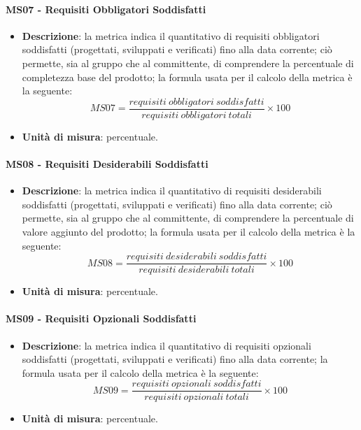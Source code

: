 		\paragraph{MS07 - Requisiti Obbligatori Soddisfatti}
		\begin{itemize}
			\item \textbf{Descrizione}: la metrica indica il quantitativo di requisiti obbligatori soddisfatti (progettati, sviluppati e verificati) fino alla data corrente; ciò permette, sia al gruppo che al committente, di comprendere la percentuale di completezza base del prodotto; la formula usata per il calcolo della metrica è la seguente:
            \[
            MS07 = \frac{requisiti\ obbligatori\ soddisfatti}{requisiti\ obbligatori\ totali} \times 100
            \]
			\item \textbf{Unità di misura}: percentuale.
		\end{itemize}

		\paragraph{MS08 - Requisiti Desiderabili Soddisfatti}
		\begin{itemize}
			\item \textbf{Descrizione}: la metrica indica il quantitativo di requisiti desiderabili soddisfatti (progettati, sviluppati e verificati) fino alla data corrente; ciò permette, sia al gruppo che al committente, di comprendere la percentuale di valore aggiunto del prodotto; la formula usata per il calcolo della metrica è la seguente:
            \[
            MS08 = \frac{requisiti\ desiderabili\ soddisfatti}{requisiti\ desiderabili\ totali} \times 100
            \]
			\item \textbf{Unità di misura}: percentuale.
		\end{itemize}

		\paragraph{MS09 - Requisiti Opzionali Soddisfatti}
		\begin{itemize}
			\item \textbf{Descrizione}: la metrica indica il quantitativo di requisiti opzionali soddisfatti (progettati, sviluppati e verificati) fino alla data corrente; la formula usata per il calcolo della metrica è la seguente:
            \[
            MS09 = \frac{requisiti\ opzionali\ soddisfatti}{requisiti\ opzionali\ totali} \times 100
            \]
			\item \textbf{Unità di misura}: percentuale.
		\end{itemize}